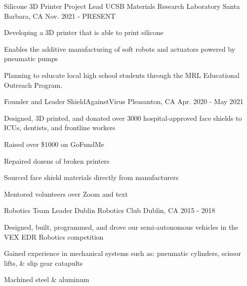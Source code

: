 \begin{cventries}
\cventry
{Silicone 3D Printer Project Lead} %
{UCSB Materials Research Laboratory} %
{Santa Barbara, CA} %
{Nov. 2021 - PRESENT} %
{ %
\begin{cvitems}
\item {Developing a 3D printer that is able to print silicone}
\item {Enables the additive manufacturing of soft robots and actuators powered by pneumatic pumps}
\item {Planning to educate local high school students through the MRL Educational Outreach Program.}
\end{cvitems}
}



\cventry
{Founder and Leader} %
{ShieldAgainstVirus} %
{Pleasanton, CA} %
{Apr. 2020 - May 2021} %
{ %
\begin{cvitems}
\item {Designed, 3D printed, and donated over 3000 hospital-approved face shields to ICUs, dentists, and frontline workers}
\item {Raised over \$1000 on GoFundMe}
\item {Repaired dozens of broken printers}
\item {Sourced face shield materials directly from manufacturers}
\item {Mentored volunteers over Zoom and text}
\end{cvitems}
}




\cventry
{Robotics Team Leader} %
{Dublin Robotics Club} %
{Dublin, CA} %
{2015 - 2018} %
{ %
\begin{cvitems}
\item {Designed, built, programmed, and drove our semi-autonomous vehicles in the VEX EDR Robotics competition}
\item {Gained experience in mechanical systems such as: pneumatic cylinders, scissor lifts, \& slip gear catapults}
\item {Machined steel \& aluminum}
\end{cvitems}
}


\end{cventries}
